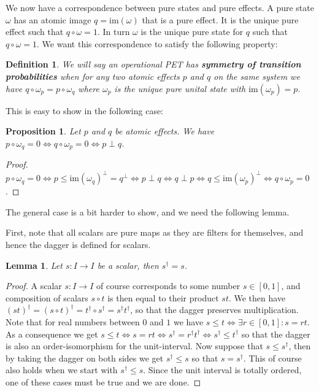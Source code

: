 \documentclass[b5paper,onecolumn,12pt,accepted=2019-05-03, issue=1, volume=1, shorttitle=papers/compositionality-1-1]{compositionalityarticle}
\newcounter{counter}
\numberwithin{counter}{section}
\newtheorem{proposition}[counter]{Proposition}
\newtheorem{definition}[counter]{Definition}
\newtheorem{lemma}[counter]{Lemma}
\newcommand{\im}[1]{\text{im}(#1)}
\begin{document}
\noindent We now have a correspondence between pure states and pure effects. A pure state $\omega$ has an atomic image $q=\im{\omega}$ that is a pure effect. It is the unique pure effect such that $q\circ\omega = 1$. In turn $\omega$ is the unique pure state for $q$ such that $q\circ\omega = 1$. We want this correspondence to satisfy the following property:

\begin{definition}
    We will say an operational PET has \textbf{symmetry of transition probabilities} \cite{alfsen2012geometry} when for any two atomic effects $p$ and $q$ on the same system we have $q\circ \omega_p= p\circ \omega_q$ where $\omega_p$ is the unique pure unital state with $\im{\omega_p}=p$.
\end{definition}

\noindent This is easy to show in the following case:
\begin{proposition}\label{prop:puredistinguish}
	Let $p$ and $q$ be atomic effects. We have $p\circ \omega_q = 0 \iff q\circ \omega_p = 0 \iff p\perp q$.
\end{proposition}
\begin{proof}
	$p\circ \omega_q=0 \iff p\leq \im{\omega_q}^\perp = q^\perp \iff p\perp q \iff q\perp p \iff q\leq \im{\omega_p}^\perp \iff q\circ \omega_p =0$.
\end{proof}

\noindent The general case is a bit harder to show, and we need the following lemma.

First, note that all scalars are pure maps as they are filters for themselves, and hence the dagger is defined for scalars.
\begin{lemma}\label{lem:scalarselfadjoint}
    Let $s: I\rightarrow I$ be a scalar, then $s^\dagger = s$.
\end{lemma}
\begin{proof}
    A scalar $s:I\rightarrow I$ of course corresponds to some number $s\in[0,1]$, and composition of scalars $s\circ t$ is then equal to their product $st$. We then have $(st)^\dagger = (s\circ t)^\dagger = t^\dagger \circ s^\dagger = s^\dagger t^\dagger$, so that the dagger preserves multiplication. 
    Note that for real numbers between $0$ and $1$ we have $s\leq t \iff \exists r\in[0,1]: s = rt$. As a consequence we get $s\leq t \iff s = rt \iff s^\dagger = r^\dagger t^\dagger \iff s^\dagger \leq t^\dagger$ so that the dagger is also an order-isomorphism for the unit-interval.
    Now suppose that $s\leq s^\dagger$, then by taking the dagger on both sides we get $s^\dagger \leq s$ so that $s=s^\dagger$. This of course also holds when we start with $s^\dagger \leq s$. Since the unit interval is totally ordered, one of these cases must be true and we are done.
\end{proof}
\end{document}
